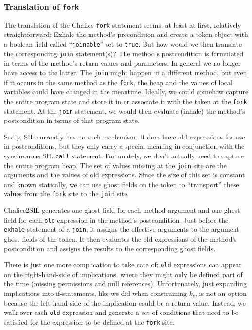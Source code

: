 \subsubsection{Translation of \lstinline!fork!}\label{sct:fjfork}

The translation of the Chalice \lstinline!fork! statement seems, at least at first, relatively straightforward: Exhale the method's precondition and create a token object with a boolean field called ``\lstinline!joinable!'' set to \lstinline!true!.
But how would we then translate the corresponding \lstinline!join! statement(s)? The method's postcondition is formulated in terms of the method's return values and parameters.
In general we no longer have access to the latter.
The \lstinline!join! might happen in a different method, but even if it occurs in the same method as the \lstinline!fork!, the heap and the values of local variables could have changed in the meantime.
Ideally, we could somehow capture the entire program state and store it in or associate it with the token at the \lstinline!fork! statement.
At the \lstinline!join! statement, we would then evaluate (inhale) the method's postcondition in terms of that program state.

Sadly, SIL currently has no such mechanism. 
It does have old expressions for use in postconditions, but they only carry a special meaning in conjunction with the synchronous SIL \lstinline!call! statement.
Fortunately, we don't actually need to capture the entire program heap. 
The set of values missing at the \lstinline!join! site are the arguments and the values of old expressions. 
Since the size of this set is constant and known statically, we can use ghost fields on the token to ``transport'' these values from the \lstinline!fork! site to the \lstinline!join! site.

Chalice2SIL generates one ghost field for each method argument and one ghost field for each \lstinline!old! expression in the method's postcondition. 
Just before the \lstinline!exhale! statement of a \lstinline!join!, it assigns the effective arguments to the argument ghost fields of the token. It then evaluates the old expressions of the method's postcondition and assigns the results to the corresponding ghost fields. 

There is just one more complication to take care of: \lstinline!old! expressions can appear on the right-hand-side of implications, where they might only be defined part of the time (missing permissions and null references). 
Unfortunately, just expanding implications into if-statements, like we did when constraining $k_c$, is not an option because the left-hand-side of the implication could be a return value. 
Instead, we walk over each \lstinline!old! expression and generate a set of conditions that need to be satisfied for the expression to be defined at the \lstinline!fork! site. 

